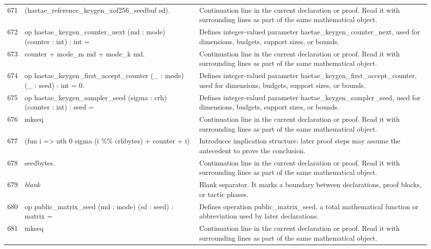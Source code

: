 \documentclass[10pt]{article}
\begin{document}
\begin{longtable}{r L{0.53\textwidth} L{0.37\textwidth}}
671 & {\ttfamily\scriptsize     (haetae\_reference\_keygen\_xof256\_seedbuf sd).} & Continuation line in the current declaration or proof.  Read it with surrounding lines as part of the same mathematical object. \\
672 & {\ttfamily\scriptsize op haetae\_keygen\_counter\_next (md : mode) (counter : int) : int =} & Defines integer-valued parameter haetae\_keygen\_counter\_next, used for dimensions, budgets, support sizes, or bounds. \\
673 & {\ttfamily\scriptsize   counter + mode\_m md + mode\_k md.} & Continuation line in the current declaration or proof.  Read it with surrounding lines as part of the same mathematical object. \\
674 & {\ttfamily\scriptsize op haetae\_keygen\_first\_accept\_counter (\_ : mode) (\_ : seed) : int = 0.} & Defines integer-valued parameter haetae\_keygen\_first\_accept\_counter, used for dimensions, budgets, support sizes, or bounds. \\
675 & {\ttfamily\scriptsize op haetae\_keygen\_sampler\_seed (sigma : crh) (counter : int) : seed =} & Defines integer-valued parameter haetae\_keygen\_sampler\_seed, used for dimensions, budgets, support sizes, or bounds. \\
676 & {\ttfamily\scriptsize   mkseq} & Continuation line in the current declaration or proof.  Read it with surrounding lines as part of the same mathematical object. \\
677 & {\ttfamily\scriptsize     (fun i => nth 0 sigma (i \%\% crhbytes) + counter + i)} & Introduces implication structure: later proof steps may assume the antecedent to prove the conclusion. \\
678 & {\ttfamily\scriptsize     seedbytes.} & Continuation line in the current declaration or proof.  Read it with surrounding lines as part of the same mathematical object. \\
679 & {\ttfamily\scriptsize \emph{blank}} & Blank separator.  It marks a boundary between declarations, proof blocks, or tactic phases. \\
680 & {\ttfamily\scriptsize op public\_matrix\_seed (md : mode) (sd : seed) : matrix =} & Defines operation public\_matrix\_seed, a total mathematical function or abbreviation used by later declarations. \\
681 & {\ttfamily\scriptsize   mkseq} & Continuation line in the current declaration or proof.  Read it with surrounding lines as part of the same mathematical object. \\

\end{longtable}
\end{document}
